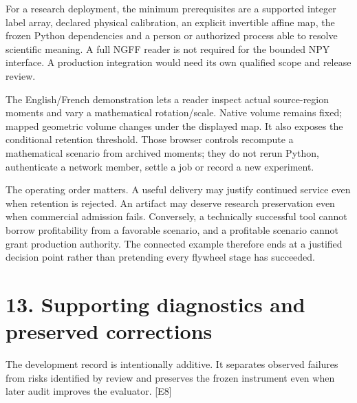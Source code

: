 \documentclass[10pt,a4paper]{article}
\begin{document}
For a research deployment, the minimum prerequisites are a supported
integer label array, declared physical calibration, an explicit
invertible affine map, the frozen Python dependencies and a person or
authorized process able to resolve scientific meaning. A full NGFF
reader is not required for the bounded NPY interface. A production
integration would need its own qualified scope and release review.

The English/French demonstration lets a reader inspect actual
source-region moments and vary a mathematical rotation/scale. Native
volume remains fixed; mapped geometric volume changes under the
displayed map. It also exposes the conditional retention threshold.
Those browser controls recompute a mathematical scenario from archived
moments; they do not rerun Python, authenticate a network member, settle
a job or record a new experiment.

The operating order matters. A useful delivery may justify continued
service even when retention is rejected. An artifact may deserve
research preservation even when commercial admission fails. Conversely,
a technically successful tool cannot borrow profitability from a
favorable scenario, and a profitable scenario cannot grant production
authority. The connected example therefore ends at a justified decision
point rather than pretending every flywheel stage has succeeded.

\clearpage

\hypertarget{supporting-diagnostics-and-preserved-corrections}{%
\section{13. Supporting diagnostics and preserved
corrections}\label{supporting-diagnostics-and-preserved-corrections}}

The development record is intentionally additive. It separates observed
failures from risks identified by review and preserves the frozen
instrument even when later audit improves the evaluator. {[}E8{]}
\end{document}
